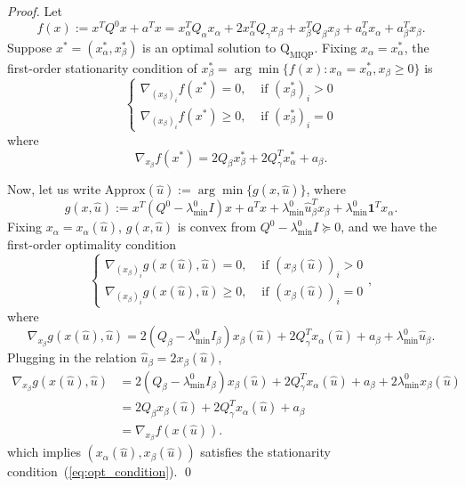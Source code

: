 \documentclass[10pt,a4paper]{amsart}
\begin{document}
\begin{proof}
    Let
    \[f(x) := x^TQ^0x + a^Tx = x_\alpha^T Q_\alpha x_\alpha + 2x_\alpha^T Q_\gamma x_\beta + x_\beta^T Q_\beta x_\beta + a_\alpha^Tx_\alpha+a_\beta^Tx_\beta.\]
    Suppose $x^*=(x^*_\alpha,x^*_\beta)$ is an optimal solution to $\mathrm{Q}_{\mathrm{MIQP}}$. Fixing $x_\alpha = x_\alpha^*$, the first-order stationarity condition of $x_\beta^* = \arg\min\{f(x):x_\alpha = x_\alpha^*, x_\beta\geq 0\}$ is
    \begin{equation}\label{eq:opt_condition}
        \left\{\begin{aligned}
        \nabla_{(x_\beta)_i} f(x^*) = 0, &\mbox{ if } (x_\beta^*)_i> 0\\
        \nabla_{(x_\beta)_i} f(x^*) \geq 0, &\mbox{ if } (x_\beta^*)_i= 0
    \end{aligned} \right.
    \end{equation}
    where
    \begin{equation*}
       \nabla_{x_\beta} f(x^*) =  2Q_\beta x^*_\beta + 2Q_\gamma^T x_\alpha^* +a_\beta.
    \end{equation*}

    Now, let us write $\mbox{Approx}(\hat{u}):=\arg\min\{g(x, \hat{u})\}$, where \[g(x, \hat{u}):=x^T(Q^0-\lambda_{\min}^0 I)x+a^Tx+\lambda^0_{\min}\hat{u}_\beta^Tx_\beta + \lambda_{\min}^0\mathbf{1}^T x_\alpha.\] Fixing $x_{\alpha} = x_\alpha(\hat{u})$, $g(x,\hat{u})$ is convex from $Q^0-\lambda_{\min}^0 I \succeq 0$, and we have the first-order optimality condition
    \[\left\{\begin{aligned}
        \nabla_{(x_\beta)_i} g(x(\hat{u}), \hat{u}) = 0, &\mbox{ if } (x_\beta(\hat{u}))_i> 0\\
        \nabla_{(x_\beta)_i} g(x(\hat{u}), \hat{u}) \geq 0, &\mbox{ if } (x_\beta(\hat{u}))_i= 0
    \end{aligned} \right.,\]
    where
    \[\nabla_{x_\beta}g(x(\hat{u}), \hat{u}) = 2(Q_\beta-\lambda_{\min}^0 I_\beta)x_\beta(\hat{u}) + 2Q_\gamma^T x_\alpha(\hat{u}) + a_\beta +\lambda_{\min}^0\hat{u}_\beta.\]
    Plugging in the relation $\hat{u}_\beta=2x_\beta(\hat{u})$,
    \begin{equation*}
        \begin{aligned}
            \nabla_{x_\beta}g(x(\hat{u}), \hat{u}) &= 2(Q_\beta-\lambda_{\min}^0 I_\beta)x_\beta(\hat{u}) +2Q_\gamma^T x_\alpha(\hat{u}) + a_\beta +2\lambda_{\min}^0 x_\beta(\hat{u})\\
            &=2Q_\beta x_\beta(\hat{u})+2Q_\gamma^T x_\alpha(\hat{u}) + a_\beta\\
            &=\nabla_{x_\beta} f(x(\hat{u})).
        \end{aligned}
    \end{equation*}
    which implies $(x_\alpha(\hat{u}), x_\beta(\hat{u}))$ satisfies the stationarity condition~(\ref{eq:opt_condition}).
    \qed
\end{proof}
\end{document}
